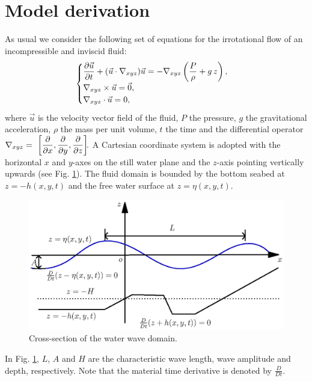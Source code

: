
\section{Model derivation}
As usual  we consider the following set of
equations for the irrotational flow of an incompressible and inviscid fluid:
\begin{equation}\label{lopes:eq:euler}
\begin{cases}
\displaystyle\frac{\partial  \vec{u}}{\partial 
  t}+(\vec{u}\cdot\nabla_{xyz})\vec{u}=-\nabla_{xyz}\left(\frac{P}{\rho} +g\, z\right),\\
\nabla_{xyz}\times \vec{u}={\vec{0}},  \\
\nabla_{xyz}\cdot{\vec{u}}=0,
\end{cases}
\end{equation}
where \(\vec{u}\) is the  velocity vector field of the fluid, \(P\) the
pressure, \(g\) the gravitational acceleration, \(\rho\) the
mass per unit volume, \(t\) the time and the differential operator \(\displaystyle\nabla_{xyz}=~\left[\frac{\partial }{\partial x},\frac{\partial }{\partial y},\frac{\partial }{\partial z}\right]\!\!.\)
A Cartesian coordinate system is adopted with the
horizontal  \(x\) and \(y\)-axes on the still water plane and
the \(z\)-axis pointing vertically upwards
(see Fig. \ref{lopes:fig:schematic}). The fluid domain is
bounded by the  bottom seabed at \(z=-h(x,y,t)\) and the free
water surface at \(z=\eta(x,y,t)\).
\begin{figure}[!htb]
{\centering
\includegraphics[width=\largewidth]{chapters/lopes/eps/graph.eps}
\caption{Cross-section of the water wave domain.}\label{lopes:fig:schematic}
\par}
\end{figure}
In Fig. \ref{lopes:fig:schematic}, \(L\), \(A\) and \(H\) are
the characteristic wave length, wave amplitude and
depth, respectively. Note that the material time derivative is
denoted by \(\frac{D}{D t}\).

